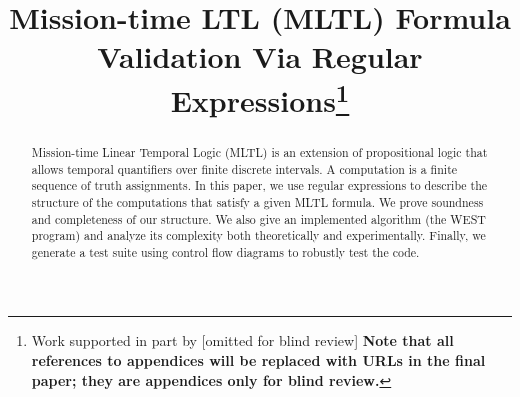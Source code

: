 \documentclass[runningheads]{llncs}
\begin{document}
%
\title{Mission-time LTL (MLTL) Formula Validation Via Regular Expressions\thanks{Work supported in part by [omitted for blind review] {\bf Note that all references to appendices will be replaced with URLs in the final paper; they are appendices only for blind review.}}}
%
%
%
%
%
\maketitle              %
%




\vspace{-0.1in}
\begin{abstract}
        \noindent Mission-time Linear Temporal Logic (MLTL) is an extension of propositional logic that allows temporal quantifiers over finite discrete intervals. A computation is a finite sequence of truth assignments. In this paper, we use regular expressions to describe the structure of the computations that satisfy a given MLTL formula. We prove soundness and completeness of our structure. We also give an implemented algorithm (the WEST program) and analyze its complexity both theoretically and experimentally. Finally, we generate a test suite using control flow diagrams to robustly test the code.
\vspace{-0.1in}
\end{abstract}
\end{document}
